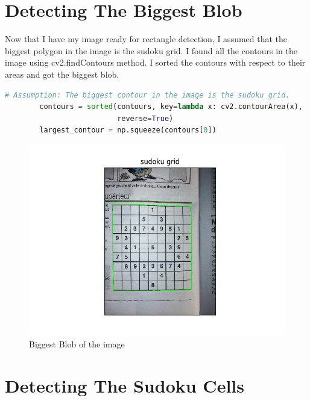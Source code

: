 \newpage

\section*{Detecting The Biggest Blob}

Now that I have my image ready for rectangle detection, I assumed that the biggest polygon in the image is the sudoku grid. I found all the contours in the image using cv2.findContours method. I sorted the contours with respect to their areas and got the biggest blob.

\begin{lstlisting}[language=Python, caption=Python example]
 # Assumption: The biggest contour in the image is the sudoku grid.
        contours = sorted(contours, key=lambda x: cv2.contourArea(x),
                          reverse=True)
        largest_contour = np.squeeze(contours[0])
\end{lstlisting}

\begin{figure}[H]
    \centering
    \includegraphics[width=\textwidth]{images/extracted_grid.png}
    \caption{Biggest Blob of the image}
    \setlength{\belowcaptionskip}{-20pt}
    \setlength{\abovecaptionskip}{-20pt}
\end{figure}

\newpage

\section*{Detecting The Sudoku Cells}

